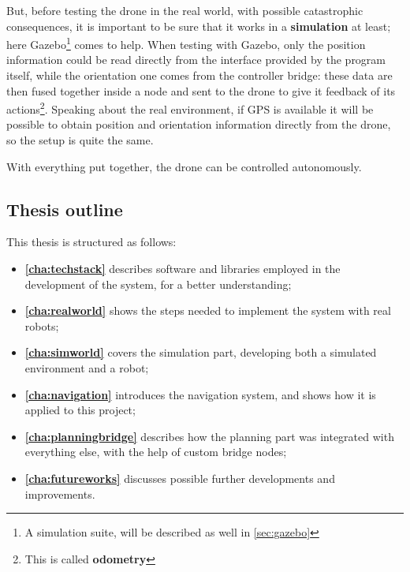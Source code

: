 But, before testing the drone in the real world, with possible catastrophic consequences, it is important to be sure that it works in a \textbf{simulation} at least; here Gazebo\footnote{A simulation suite, will be described as well in \autoref{sec:gazebo}} comes to help. When testing with Gazebo, only the position information could be read directly from the interface provided by the program itself, while the orientation one comes from the controller bridge: these data are then fused together inside a node and sent to the drone to give it feedback of its actions\footnote{This is called \textbf{odometry}}. Speaking about the real environment, if GPS is available it will be possible to obtain position and orientation information directly from the drone, so the setup is quite the same. 

With everything put together, the drone can be controlled autonomously.

\subsection{Thesis outline}

This thesis is structured as follows:
\begin{itemize}
  \item \textbf{\autoref{cha:techstack}} describes software and libraries employed in the development of the system, for a better understanding;
  \item \textbf{\autoref{cha:realworld}} shows the steps needed to implement the system with real robots;
  \item \textbf{\autoref{cha:simworld}} covers the simulation part, developing both a simulated environment and a robot;
  \item \textbf{\autoref{cha:navigation}} introduces the navigation system, and shows how it is applied to this project;
  \item \textbf{\autoref{cha:planningbridge}} describes how the planning part was integrated with everything else, with the help of custom bridge nodes;
  \item \textbf{\autoref{cha:futureworks}} discusses possible further developments and improvements.
\end{itemize}